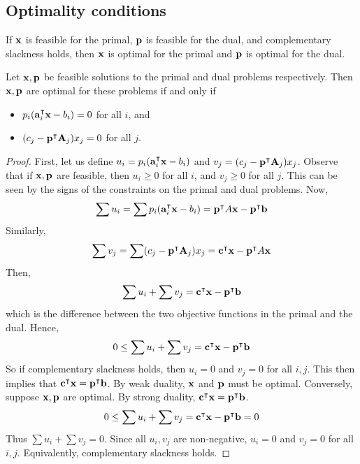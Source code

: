 \subsection{Optimality conditions}
If \( \vb x \) is feasible for the primal, \( \vb p \) is feasible for the dual, and complementary slackness holds, then \( \vb x \) is optimal for the primal and \( \vb p \) is optimal for the dual.
\begin{theorem}
	Let \( \vb x, \vb p \) be feasible solutions to the primal and dual problems respectively.
	Then \( \vb x, \vb p \) are optimal for these problems if and only if
	\begin{itemize}
		\item \( p_i (\vb a_i^\intercal \vb x - b_i) = 0 \) for all \( i \), and
		\item  \( (c_j - \vb p^\intercal \vb A_j) x_j = 0 \) for all \( j \).
	\end{itemize}
\end{theorem}
\begin{proof}
	First, let us define \( u_i = p_i (\vb a_i^\intercal \vb x - b_i ) \) and \( v_j = (c_j - \vb p^\intercal \vb A_j) x_j \).
	Observe that if \( \vb x, \vb p \) are feasible, then \( u_i \geq 0 \) for all \( i \), and \( v_j \geq 0 \) for all \( j \).
	This can be seen by the signs of the constraints on the primal and dual problems.
	Now,
	\[
		\sum u_i = \sum p_i (\vb a_i^\intercal \vb x - b_i ) = \vb p^\intercal A \vb x - \vb p^\intercal \vb b
	\]
	Similarly,
	\[
		\sum v_j = \sum (c_j - \vb p^\intercal \vb A_j) x_j = \vb c^\intercal \vb x - \vb p^\intercal A \vb x
	\]
	Then,
	\[
		\sum u_i + \sum v_j = \vb c^\intercal \vb x - \vb p^\intercal \vb b
	\]
	which is the difference between the two objective functions in the primal and the dual.
	Hence,
	\[
		0 \leq \sum u_i + \sum v_j = \vb c^\intercal \vb x - \vb p^\intercal \vb b
	\]
	So if complementary slackness holds, then \( u_i = 0 \) and \( v_j = 0 \) for all \( i, j \).
	This then implies that \( \vb c^\intercal \vb x = \vb p^\intercal \vb b \).
	By weak duality, \( \vb x \) and \( \vb p \) must be optimal.
	Conversely, suppose \( \vb x, \vb p \) are optimal.
	By strong duality, \( \vb c^\intercal \vb x = \vb p^\intercal \vb b \).
	\[
		0 \leq \sum u_i + \sum v_j = \vb c^\intercal \vb x - \vb p^\intercal \vb b = 0
	\]
	Thus \( \sum u_i + \sum v_j = 0 \).
	Since all \( u_i, v_j \) are non-negative, \( u_i = 0 \) and \( v_j = 0 \) for all \( i, j \).
	Equivalently, complementary slackness holds.
\end{proof}
